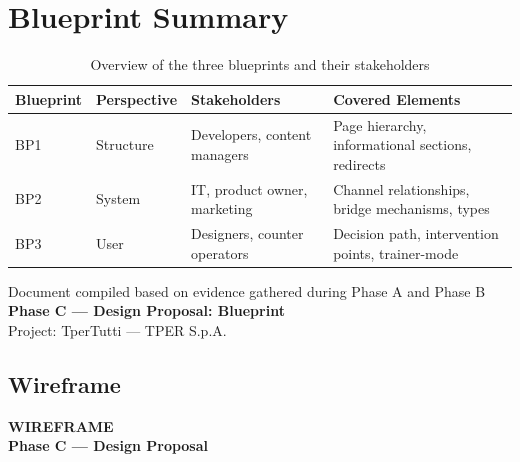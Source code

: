 ﻿\documentclass[11pt,a4paper]{article}
\begin{document}
\section{Blueprint Summary}

\begin{table}[H]
\centering
\small
\renewcommand{\arraystretch}{1.3}
\begin{tabular}{|p{1.8cm}|p{3cm}|p{3.5cm}|p{5cm}|}
\hline
\textbf{Blueprint} & \textbf{Perspective} & \textbf{Stakeholders} & \textbf{Covered Elements} \\
\hline
BP1 & Structure & Developers, content managers & Page hierarchy, informational sections, redirects \\
\hline
BP2 & System & IT, product owner, marketing & Channel relationships, bridge mechanisms, types \\
\hline
BP3 & User & Designers, counter operators & Decision path, intervention points, trainer-mode \\
\hline
\end{tabular}
\caption{Overview of the three blueprints and their stakeholders}
\label{tab:riepilogo-bp}
\end{table}

\vspace{0.5cm}

\begin{center}
{\color{secondaryColor}\small
Document compiled based on evidence gathered during Phase A and Phase B \\[4pt]
\textbf{Phase C --- Design Proposal: Blueprint} \\[4pt]
Project: TperTutti --- TPER S.p.A.}
\end{center}

\vspace{0.3cm}


\newpage

\subsection{Wireframe}

\begin{tcolorbox}[headerbox]
 \color{white}\LARGE\bfseries\sffamily WIREFRAME \\[0.1cm]
 \color{white!80}\small\sffamily Phase C --- Design Proposal
\end{tcolorbox}

\vspace{0.3cm}
\end{document}
